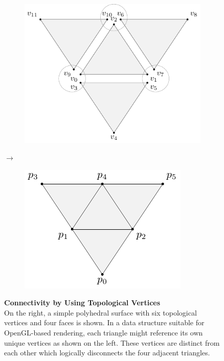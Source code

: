 \documentclass{stdlocal}
\begin{document}
  \begin{figure}[t]
    \centering
    \begin{subfigure}[c]{0.40\linewidth}
      \centering
      \includegraphics[width=\linewidth]{figures/polyhedral-surface-separated.pdf}
    \end{subfigure}
    \hfill
    $\longrightarrow$
    \hfill
    \begin{subfigure}[c]{0.40\linewidth}
      \centering
      \includegraphics[width=\linewidth]{figures/polyhedral-surface-joint.pdf}
    \end{subfigure}
    \caption[Connectivity by Using Topological Vertices]{%
      \textbf{Connectivity by Using Topological Vertices}\\
      On the right, a simple polyhedral surface with six topological vertices and four faces is shown.
      In a data structure suitable for OpenGL-based rendering, each triangle might reference its own unique vertices as shown on the left.
      These vertices are distinct from each other which logically disconnects the four adjacent triangles.
    }
    \label{fig:polyhedral-surface-distinct-vertices}
  \end{figure}
\end{document}
